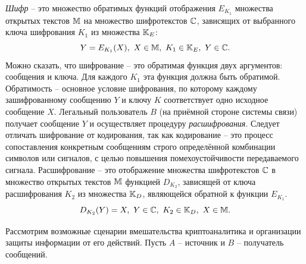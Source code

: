 \emph{Шифр} -- это множество обратимых функций отображения $E_{K_1}$ множества открытых текстов $\mathbb{M}$ на множество шифротекстов $\mathbb{C}$, зависящих от выбранного ключа шифрования $K_1$ из множества $\mathbb{K}_E$:
\begin{equation}
    \label{eq:Encryption}
    Y = E_{K_1}(X), ~ X \in \mathbb{M}, ~ K_1 \in \mathbb{K}_E, ~ Y \in \mathbb{C}.
\end{equation}
Можно сказать, что шифрование -- это обратимая функция двух аргументов: сообщения и ключа. Для каждого $K_1$ эта функция должна быть обратимой. Обратимость -- основное условие шифрования, по которому каждому зашифрованному сообщению $Y$ и ключу $K$ соответствует одно исходное сообщение $X$. Легальный пользователь $B$ (на приёмной стороне системы связи)  получает сообщение $Y$ и осуществляет процедуру \emph{расшифрования}.
Следует отличать шифрование от кодирования, так как кодирование -- это процесс сопоставления конкретным сообщениям строго определённой комбинации символов или сигналов, с целью повышения помехоустойчивости передаваемого сигнала.
Расшифрование --  это отображение множества шифротекстов $\mathbb{C}$ в множество открытых текстов $\mathbb{M}$ функцией $D_{K_2}$, зависящей от ключа расшифрования $K_2$ из множества $\mathbb{K}_D$, являющейся обратной к функции $E_{K_1}$.
\begin{equation}
    \label{eq:Decryption}
    D_{K_2}(Y) = X, ~ Y \in \mathbb{C}, ~ K_2 \in \mathbb{K}_D, ~ X \in \mathbb{M}.
\end{equation}



Рассмотрим возможные сценарии вмешательства криптоаналитика и организации защиты информации от его действий.
Пусть  $A$ --  источник и $B$ -- получатель сообщений.

